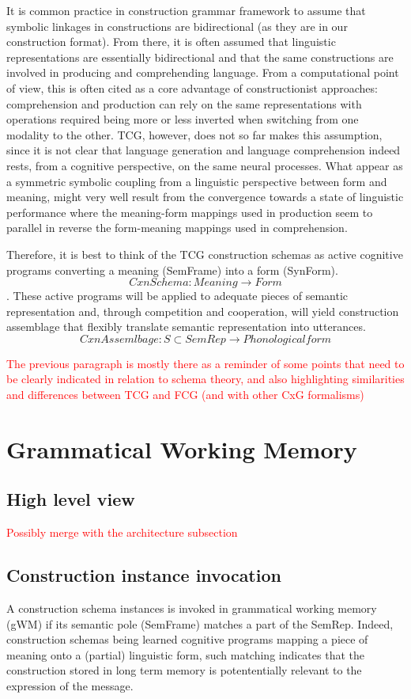 \documentclass{article}
\newcommand\todo[1]{\textcolor{red}{#1}}
\begin{document}
It is common practice in construction grammar framework to assume that symbolic linkages in constructions are bidirectional (as they are in our construction format). From there, it is often assumed that linguistic representations are essentially bidirectional and that the same constructions are involved in producing and comprehending language. From a computational point of view, this is often cited as a core advantage of constructionist approaches: comprehension and production can rely on the same representations with operations required being more or less inverted when switching from one modality to the other. TCG, however, does not so far makes this assumption, since it is not clear that language generation and language comprehension indeed rests, from a cognitive perspective, on the same neural processes. What appear as a symmetric symbolic coupling from a linguistic perspective between form and meaning, might very well result from the convergence towards a state of linguistic performance where the meaning-form mappings used in production seem to parallel in reverse the form-meaning mappings used in comprehension.

Therefore, it is best to think of the TCG construction schemas as active cognitive programs converting a meaning (SemFrame) into a form (SynForm). $$ Cxn Schema: Meaning \rightarrow Form $$.
These active programs will be applied to adequate pieces of semantic representation and, through competition and cooperation, will yield construction assemblage that flexibly translate semantic representation into utterances. $$ CxnAssemlbage: S \subset SemRep \rightarrow Phonological form $$

\todo{The previous paragraph is mostly there as a reminder of some points that need to be clearly indicated in relation to schema theory, and also highlighting similarities and differences between TCG and FCG (and with other CxG formalisms)}

\section{Grammatical Working Memory}

\subsection{High level view}

\todo{Possibly merge with the architecture subsection}

\subsection{Construction instance invocation}
A construction schema instances is invoked in grammatical working memory (gWM) if its semantic pole (SemFrame) matches a part of the SemRep. Indeed, construction schemas being learned cognitive programs mapping a piece of meaning onto a (partial) linguistic form, such matching indicates that the construction stored in long term memory is potententially relevant to the expression of the message.
\end{document}
